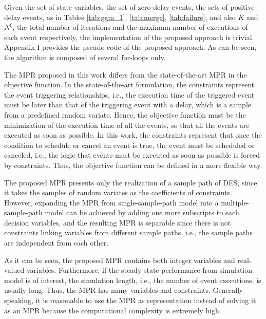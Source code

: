 \documentclass[]{interact}
\theoremstyle{plain}%
\theoremstyle{definition}
\theoremstyle{remark}
\begin{document}
Given the set of state variables, the set of zero-delay events, the sets of positive-delay events, as in Tables \ref{tab:ggm_1}, \ref{tab:merge}, \ref{tab:failure}, and also $K$ and $N^{\xi}$, the total number of  iterations and the maximum number of executions of each event respectively, the implementation of the proposed approach is trivial. Appendix I provides the pseudo code of the proposed approach. As can be seen, the algorithm is composed of several for-loops only.  

The MPR proposed in this work differs from the state-of-the-art MPR \citep{chan2008optimization} in the objective function. In the state-of-the-art formulation, the constraints represent the event triggering relationships, i.e., the execution time of the triggered event must be later than that of the triggering event with a delay, which is a sample from a predefined random variate. Hence, the objective function must be the minimization of the execution time of all the events, so that all the events are executed as soon as possible. In this work, the constraints represent that once the condition to schedule or cancel an event is true, the event must be scheduled or canceled, i.e., the logic that events must be executed as soon as possible is forced by constraints. Thus, the objective function can be defined in a more flexible way. 

The proposed MPR presents only the realization of a sample path of DES, since it takes the samples of random variates as the coefficients of constraints. However, expanding the MPR from single-sample-path model into a multiple-sample-path model can be achieved by adding one more subscripts to each decision variables, and the resulting MPR is separable since there is not constraints linking variables from different sample paths, i.e., the sample paths are independent from each other. 

As it can be seen, the proposed MPR contains both integer variables and real-valued variables. Furthermore, if the steady state performance from simulation model is of interest, the simulation length, i.e., the number of event executions, is usually long. Thus, the MPR has many variables and constraints. Generally speaking, it is reasonable to use the MPR as representation instead of solving it as an MPR because the computational complexity is extremely high. 
\end{document}
